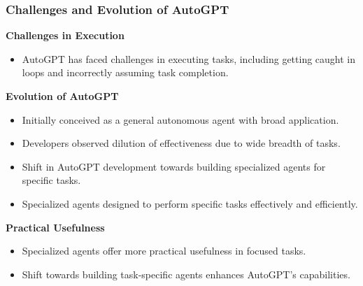 \begin{frame}[fragile]
\frametitle{Challenges and Evolution of AutoGPT}

\textbf{Challenges in Execution}
\begin{itemize}
    \item AutoGPT has faced challenges in executing tasks, including getting caught in loops and incorrectly assuming task completion.
\end{itemize}

\textbf{Evolution of AutoGPT}
\begin{itemize}
    \item Initially conceived as a general autonomous agent with broad application.
    \item Developers observed dilution of effectiveness due to wide breadth of tasks.
    \item Shift in AutoGPT development towards building specialized agents for specific tasks.
    \item Specialized agents designed to perform specific tasks effectively and efficiently.
\end{itemize}

\textbf{Practical Usefulness}
\begin{itemize}
    \item Specialized agents offer more practical usefulness in focused tasks.
    \item Shift towards building task-specific agents enhances AutoGPT's capabilities.
\end{itemize}

\end{frame}

